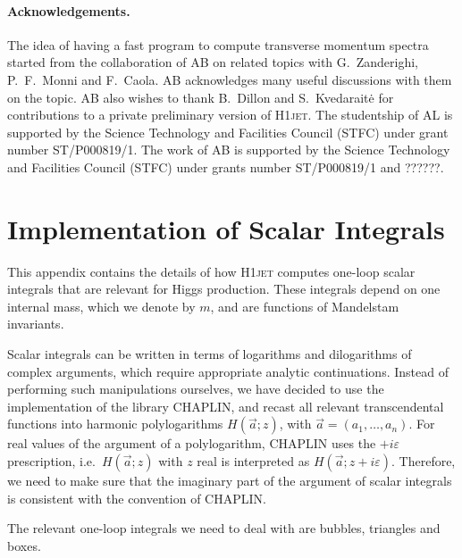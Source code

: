 \documentclass[12pt]{article}
\begin{document}
\paragraph{Acknowledgements.} The idea of having a fast program to
compute transverse momentum spectra started from the collaboration of
AB on related topics with G.~Zanderighi, P.~F.~Monni and F.~Caola. AB
acknowledges many useful discussions with them on the topic. AB also
wishes to thank B.~Dillon and S.~Kvedarait\.e for contributions to a
private preliminary version of \textsc{H1jet}. The studentship of AL is
supported by the Science Technology and Facilities Council (STFC)
under grant number ST/P000819/1. The work of AB is supported by the
Science Technology and Facilities Council (STFC) under grants number
ST/P000819/1 and ??????.

\appendix

\section{Implementation of Scalar Integrals}
\label{sec:scalar-integrals}

This appendix contains the details of how \textsc{H1jet} computes one-loop
scalar integrals that are relevant for Higgs production. These
integrals depend on one internal mass, which we denote by $m$, and are
functions of Mandelstam
invariants.

Scalar integrals can be written in terms of logarithms and dilogarithms of complex
arguments, which require appropriate analytic continuations. Instead of performing such manipulations ourselves, we have
decided to use the implementation of the library CHAPLIN, and recast all relevant transcendental
functions into harmonic polylogarithms $H(\vec a;z)$, with
$\vec a=(a_1,\dots,a_n)$. For real values of the argument of a polylogarithm, CHAPLIN
uses the $+i\varepsilon$ prescription, i.e.\ $H(\vec a;z)$ with $z$
real is interpreted as $H(\vec a;z+i\varepsilon)$. Therefore, we need
to make sure that the imaginary part of the argument of scalar
integrals is consistent with the convention of CHAPLIN.

The relevant one-loop integrals we need to deal with are  
bubbles, triangles and boxes.
\end{document}
